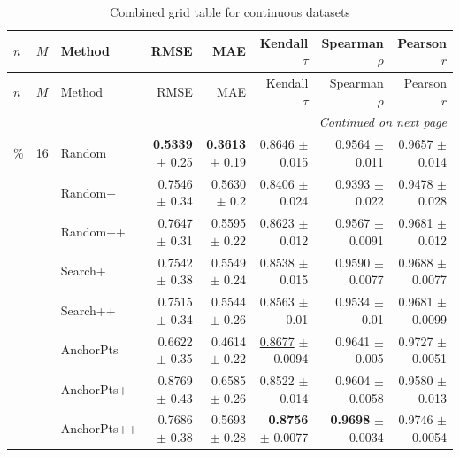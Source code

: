 \footnotesize
\setlength{\tabcolsep}{2pt}
\renewcommand{\arraystretch}{1.05}
\setlength{\LTpre}{0pt}
\setlength{\LTpost}{0pt}
\setlength{\LTleft}{\fill}
\setlength{\LTright}{\fill}
\begin{longtable}{llp{}rrrrr}
\caption{Combined grid table for continuous datasets}\label{tab:combined\_grid\_continuous}\\
\toprule
$n$ & $M$ & Method & RMSE & MAE & Kendall $\tau$ & Spearman $\rho$ & Pearson $r$ \\
\midrule
\endfirsthead
\toprule
$n$ & $M$ & Method & RMSE & MAE & Kendall $\tau$ & Spearman $\rho$ & Pearson $r$ \\
\midrule
\endhead
\midrule
\multicolumn{8}{r}{\emph{Continued on next page}} \\
\midrule
\endfoot
\bottomrule
\endlastfoot
5\% & 16 & Random & \textbf{0.5339} {\scriptsize $\pm$ 0.25} & \textbf{0.3613} {\scriptsize $\pm$ 0.19} & 0.8646 {\scriptsize $\pm$ 0.015} & 0.9564 {\scriptsize $\pm$ 0.011} & 0.9657 {\scriptsize $\pm$ 0.014} \\
 &  & Random+ & 0.7546 {\scriptsize $\pm$ 0.34} & 0.5630 {\scriptsize $\pm$ 0.2} & 0.8406 {\scriptsize $\pm$ 0.024} & 0.9393 {\scriptsize $\pm$ 0.022} & 0.9478 {\scriptsize $\pm$ 0.028} \\
 &  & Random++ & 0.7647 {\scriptsize $\pm$ 0.31} & 0.5595 {\scriptsize $\pm$ 0.22} & 0.8623 {\scriptsize $\pm$ 0.012} & 0.9567 {\scriptsize $\pm$ 0.0091} & 0.9681 {\scriptsize $\pm$ 0.012} \\
 &  & Search+ & 0.7542 {\scriptsize $\pm$ 0.38} & 0.5549 {\scriptsize $\pm$ 0.24} & 0.8538 {\scriptsize $\pm$ 0.015} & 0.9590 {\scriptsize $\pm$ 0.0077} & 0.9688 {\scriptsize $\pm$ 0.0077} \\
 &  & Search++ & 0.7515 {\scriptsize $\pm$ 0.34} & 0.5544 {\scriptsize $\pm$ 0.26} & 0.8563 {\scriptsize $\pm$ 0.01} & 0.9534 {\scriptsize $\pm$ 0.01} & 0.9681 {\scriptsize $\pm$ 0.0099} \\
 &  & AnchorPts & 0.6622 {\scriptsize $\pm$ 0.35} & 0.4614 {\scriptsize $\pm$ 0.22} & \underline{0.8677} {\scriptsize $\pm$ 0.0094} & 0.9641 {\scriptsize $\pm$ 0.005} & 0.9727 {\scriptsize $\pm$ 0.0051} \\
 &  & AnchorPts+ & 0.8769 {\scriptsize $\pm$ 0.43} & 0.6585 {\scriptsize $\pm$ 0.26} & 0.8522 {\scriptsize $\pm$ 0.014} & 0.9604 {\scriptsize $\pm$ 0.0058} & 0.9580 {\scriptsize $\pm$ 0.013} \\
 &  & AnchorPts++ & 0.7686 {\scriptsize $\pm$ 0.38} & 0.5693 {\scriptsize $\pm$ 0.28} & \textbf{0.8756} {\scriptsize $\pm$ 0.0077} & \textbf{0.9698} {\scriptsize $\pm$ 0.0034} & 0.9746 {\scriptsize $\pm$ 0.0054} \\

\end{longtable}
